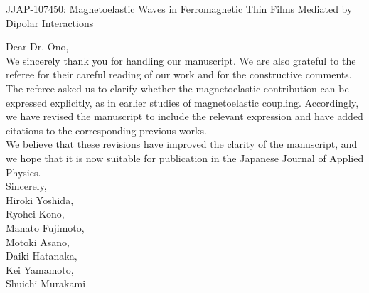\documentclass[11pt]{revtex4-2}
\begin{document}
\begin{center}
{\Large JJAP-107450: Magnetoelastic Waves in Ferromagnetic Thin Films Mediated by Dipolar Interactions}\\[0.5em]
\end{center}

Dear Dr. Ono,\\

We sincerely thank you for handling our manuscript. We are also grateful to the referee for their careful reading of our work and for the constructive comments.\\

The referee asked us to clarify whether the magnetoelastic contribution can be expressed explicitly, as in earlier studies of magnetoelastic coupling. Accordingly, we have revised the manuscript to include the relevant expression and have added citations to the corresponding previous works.\\

We believe that these revisions have improved the clarity of the manuscript, and we hope that it is now suitable for publication in the Japanese Journal of Applied Physics.\\


\noindent
Sincerely,\\

\noindent
Hiroki Yoshida,\\
Ryohei Kono,\\
Manato Fujimoto,\\
Motoki Asano,\\
Daiki Hatanaka,\\
Kei Yamamoto,\\
Shuichi Murakami


\newpage
\end{document}
